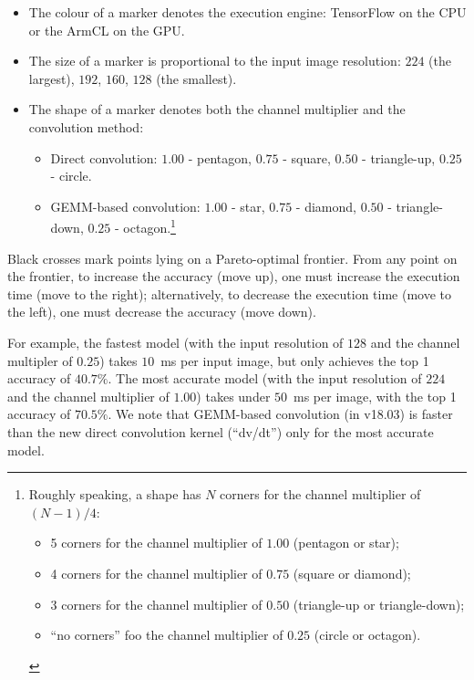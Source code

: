 \documentclass[sigplan]{acmart}
\begin{document}
\begin{itemize}

  \item The colour of a marker denotes the execution engine: TensorFlow on the CPU or the ArmCL on the GPU.

  \item The size of a marker is proportional to the input image resolution: $224$ (the largest), $192$, $160$, $128$ (the smallest).

  \item The shape of a marker denotes both the channel multiplier and the convolution method:
  \begin{itemize}
    \item Direct convolution: $1.00$ - pentagon, $0.75$ - square, $0.50$ - triangle-up, $0.25$ - circle.
    \item GEMM-based convolution: $1.00$ - star, $0.75$ - diamond, $0.50$ - triangle-down, $0.25$ - octagon.\footnote{%
      Roughly speaking, a shape has $N$ corners for the channel multiplier of $(N-1)/4$:
      \begin{itemize}
        \item 5 corners for the channel multiplier of $1.00$ (pentagon or star);
        \item 4 corners for the channel multiplier of $0.75$ (square or diamond);
        \item 3 corners for the channel multiplier of $0.50$ (triangle-up or triangle-down);
        \item ``no corners'' foo the channel multiplier of $0.25$ (circle or octagon).
      \end{itemize}
      }
  \end{itemize}
\end{itemize}

Black crosses mark points lying on a Pareto-optimal frontier. 
%
From any point on the frontier, to increase the accuracy (move up), one must
increase the execution time (move to the right); alternatively, to decrease the
execution time (move to the left), one must decrease the accuracy (move down).

For example, the fastest model (with the input resolution of $128$ and the
channel multipler of $0.25$) takes $10$~ms per input image, but only achieves
the top 1 accuracy of $40.7\%$. 
%
The most accurate model (with the input resolution of $224$ and the channel
multiplier of $1.00$) takes under $50$~ms per image, with the top 1 accuracy of
$70.5\%$.
%
We note that GEMM-based convolution (in v18.03) is faster than the new direct
convolution kernel (``dv/dt'') only for the most accurate model.
\end{document}
